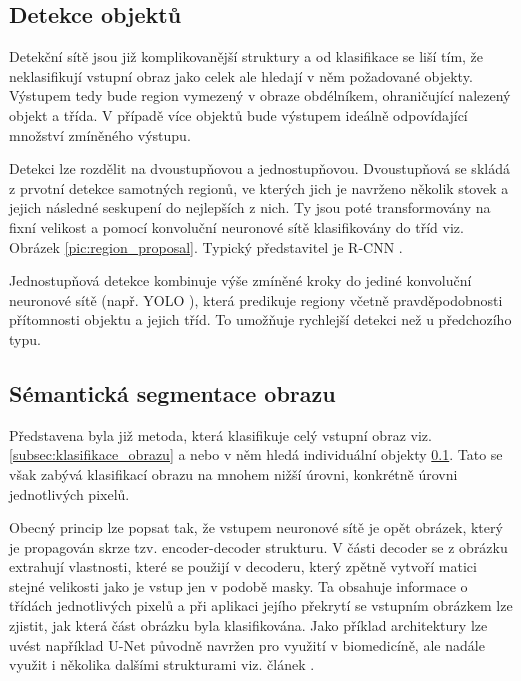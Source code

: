 \documentclass[czech, bc, kky, he, iso690alph]{fasthesis}
\begin{document}
           	\subsection{Detekce objektů}\label{subsec:detekce_objektu}
           		Detekční sítě jsou již komplikovanější struktury a od klasifikace se liší tím, že neklasifikují vstupní obraz jako celek ale hledají v něm požadované objekty. Výstupem tedy bude region vymezený v obraze obdélníkem, ohraničující nalezený objekt a třída. V případě více objektů bude výstupem ideálně odpovídající množství zmíněného výstupu.
           		
           		Detekci lze rozdělit na dvoustupňovou a jednostupňovou. Dvoustupňová se skládá z prvotní detekce samotných regionů, ve kterých jich je navrženo několik stovek a jejich následné seskupení do nejlepších z nich. Ty jsou poté transformovány na fixní velikost a pomocí konvoluční neuronové sítě klasifikovány do tříd viz. Obrázek \ref{pic:region_proposal}. Typický představitel je R-CNN \cite{R-CNN}.
           		
           		Jednostupňová detekce kombinuje výše zmíněné kroky do jediné konvoluční neuronové sítě (např. YOLO \cite{YOLO}), která predikuje regiony včetně pravděpodobnosti přítomnosti objektu a jejich tříd. To umožňuje rychlejší detekci než u předchozího typu.
           	
           	\subsection{Sémantická segmentace obrazu}
            	Představena byla již metoda, která klasifikuje celý vstupní obraz viz. \ref{subsec:klasifikace_obrazu} a nebo v něm hledá individuální objekty \ref{subsec:detekce_objektu}. Tato se však zabývá klasifikací obrazu na mnohem nižší úrovni, konkrétně úrovni jednotlivých pixelů.
            	
            	Obecný princip lze popsat tak, že vstupem neuronové sítě je opět obrázek, který je propagován skrze tzv. encoder-decoder strukturu. V části decoder se z obrázku extrahují vlastnosti, které se použijí v decoderu, který zpětně vytvoří matici stejné velikosti jako je vstup jen v podobě masky. Ta obsahuje informace o třídách jednotlivých pixelů a při aplikaci jejího překrytí se vstupním obrázkem lze zjistit, jak která část obrázku byla klasifikována. Jako příklad architektury lze uvést například U-Net \cite{U-Net} původně navržen pro využití v biomedicíně, ale nadále využit i několika dalšími strukturami viz. článek \cite{semantic_segmentation_survey}. 
            	
\end{document}

